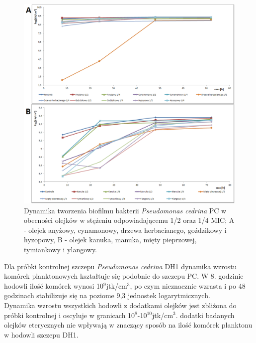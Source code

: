 \documentclass[11pt,a4paper]{report}
\begin{document}
\begin{figure}[!h]
\begin{center}
\includegraphics[scale=0.55]{img/pc-c.png}
\caption{Dynamika tworzenia biofilmu bakterii \textit{Pseudomonas cedrina} PC w obecności olejków w stężeniu odpowiadającemu 1/2 oraz 1/4 MIC; A - olejek anyżowy, cynamonowy, drzewa herbacianego, goździkowy i hyzopowy, B - olejek kanuka, manuka, mięty pieprzowej, tymiankowy i ylangowy.}\label{pc-c}
\end{center} 
\end{figure}

\clearpage


Dla próbki kontrolnej szczepu \textit{Pseudomonas cedrina} DH1 dynamika wzrostu komórek planktonowych kształtuje się podobnie do szczepu PC. W 8. godzinie hodowli ilość komórek wynosi 10$^9$jtk/cm$^3$, po czym nieznacznie wzrasta i po 48 godzinach stabilizuje się na poziome 9,3 jednostek logarytmicznych.\\
Dynamika wzrostu wszystkich hodowli z dodatkami olejków jest zbliżona do próbki kontrolnej i oscyluje w granicach 10$^8$-10$^10$jtk/cm$^3$. dodatki badanych olejków eterycznych nie wpływają w znaczący sposób na ilość komórek planktonu w hodowli szczepu DH1.
\end{document}

